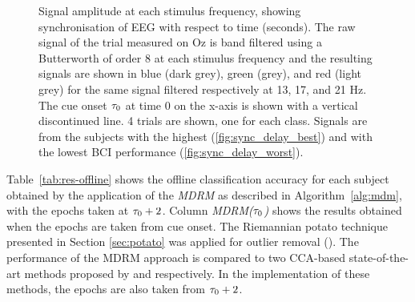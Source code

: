 \begin{figure}[htb!]
\centering
{}
\caption{Signal amplitude at each stimulus frequency, showing synchronisation of EEG with respect to time (seconds).
         The raw signal of the trial measured on Oz is band filtered using a Butterworth of order 8 at each stimulus frequency and the resulting signals are shown in blue (dark grey), green (grey), and red (light grey) for the same signal filtered respectively at 13, 17, and 21 Hz. 
         The cue onset $\tau_0$ at time $0$ on the x-axis is shown with a vertical discontinued line. 
         4 trials are shown, one for each class. Signals are from the subjects with the highest (\ref{fig:sync_delay_best}) and with the lowest BCI performance (\ref{fig:sync_delay_worst}).}
         \label{fig:sync_delay}
\end{figure}


Table~\ref{tab:res-offline} shows the offline classification accuracy for each subject obtained by the application of the \emph{MDRM} as described in Algorithm~\ref{alg:mdm}, with the epochs taken at $\tau_0+2$.
Column \emph{MDRM($\tau_0$)} shows the results obtained when the epochs are taken from cue onset.
The Riemannian potato technique presented in Section \ref{sec:potato} was applied for outlier removal (\emph{\mdrmpotato}).
The performance of the MDRM approach is compared to two CCA-based state-of-the-art methods %
proposed by \cite{lin_frequency_2006} and \cite{nakanishi_high-speed_2014} respectively.
In the implementation of these methods, the epochs are also taken from $\tau_0+2$.

